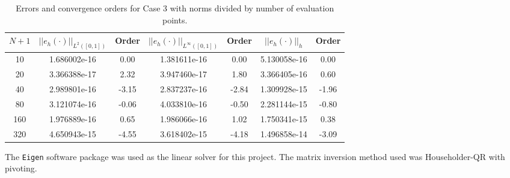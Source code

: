 \documentclass[a4paper, 12pt]{article}
\begin{document}
\begin{table}[!ht]
\caption{Errors and convergence orders for Case 3 with norms divided by number of evaluation points.}
\vspace{0.1in}
\centering
\begin{tabular}{|c|c|c| c| c| c| c|}
\hline
 $N+1$&  $||e_h(\cdot)||_{L^2([0,1])}$ & Order  & $||e_h(\cdot)||_{L^\infty([0,1])}$ & Order& $||e_h(\cdot)||_h$& Order \\
 \hline
     10  & 1.686002e-16 & 0.00 & 1.381611e-16 &  0.00 & 5.130058e-16 &  0.00\\
     20  & 3.366388e-17 & 2.32 & 3.947460e-17 &  1.80 & 3.366405e-16 &  0.60\\
     40  & 2.989801e-16 &-3.15 & 2.837237e-16 & -2.84 & 1.309928e-15 & -1.96\\
     80  & 3.121074e-16 &-0.06 & 4.033810e-16 & -0.50 & 2.281144e-15 & -0.80\\
     160 & 1.976889e-16 & 0.65 & 1.986066e-16 &  1.02 & 1.750341e-15 &  0.38\\
     320 & 4.650943e-15 &-4.55 & 3.618402e-15 & -4.18 & 1.496858e-14 & -3.09\\
\hline
\end{tabular}
\label{tab:C3n}
\end{table}

The \texttt{Eigen} software package
was used as the linear solver for this project. 
The matrix inversion method used was Householder-QR with pivoting.
\end{document}
